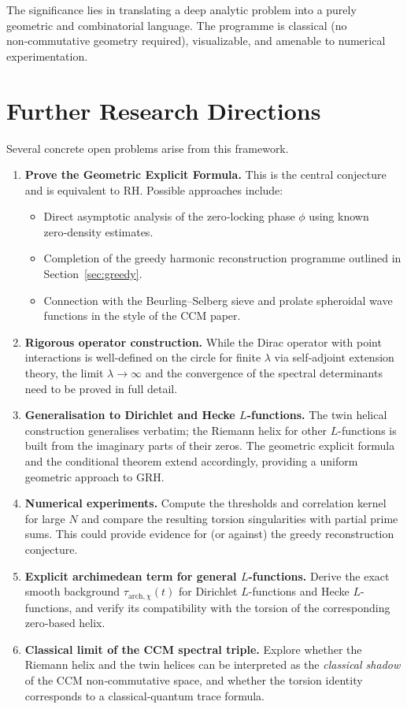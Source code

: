 \documentclass[11pt,a4paper]{article}
\begin{document}
The significance lies in translating a deep analytic problem into a purely geometric and combinatorial language.  The programme is classical (no non‑commutative geometry required), visualizable, and amenable to numerical experimentation.

\section{Further Research Directions}\label{sec:open}

Several concrete open problems arise from this framework.

\begin{enumerate}[label=(\arabic*)]
\item \textbf{Prove the Geometric Explicit Formula.}  This is the central conjecture and is equivalent to RH.  Possible approaches include:
  \begin{itemize}
  \item Direct asymptotic analysis of the zero‑locking phase \(\phi\) using known zero‑density estimates.
  \item Completion of the greedy harmonic reconstruction programme outlined in Section~\ref{sec:greedy}.
  \item Connection with the Beurling–Selberg sieve and prolate spheroidal wave functions in the style of the CCM paper.
  \end{itemize}
\item \textbf{Rigorous operator construction.}  While the Dirac operator with point interactions is well‑defined on the circle for finite \(\lambda\) via self‑adjoint extension theory, the limit \(\lambda\to\infty\) and the convergence of the spectral determinants need to be proved in full detail.
\item \textbf{Generalisation to Dirichlet and Hecke \(L\)-functions.}  The twin helical construction generalises verbatim; the Riemann helix for other \(L\)-functions is built from the imaginary parts of their zeros.  The geometric explicit formula and the conditional theorem extend accordingly, providing a uniform geometric approach to GRH.
\item \textbf{Numerical experiments.}  Compute the thresholds and correlation kernel for large \(N\) and compare the resulting torsion singularities with partial prime sums.  This could provide evidence for (or against) the greedy reconstruction conjecture.
\item \textbf{Explicit archimedean term for general \(L\)-functions.}  Derive the exact smooth background \(\tau_{\text{arch},\chi}(t)\) for Dirichlet \(L\)-functions and Hecke \(L\)-functions, and verify its compatibility with the torsion of the corresponding zero‑based helix.
\item \textbf{Classical limit of the CCM spectral triple.}  Explore whether the Riemann helix and the twin helices can be interpreted as the \emph{classical shadow} of the CCM non‑commutative space, and whether the torsion identity corresponds to a classical‑quantum trace formula.
\end{enumerate}
\end{document}
